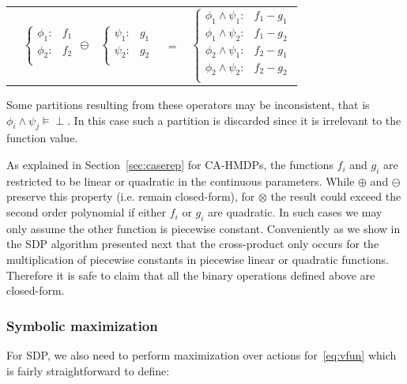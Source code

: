\documentclass[twoside,11pt]{article}
\begin{document}
{\begin{center}
\hspace{-2mm}
\begin{tabular}{r c c c l}
&
\hspace{-6mm} 
  $\begin{cases}
    \phi_1: & f_1 \\ 
    \phi_2: & f_2 \\ 
  \end{cases}$
$\ominus$
&
\hspace{-4mm}
  $\begin{cases}
    \psi_1: & g_1 \\ 
    \psi_2: & g_2 \\ 
  \end{cases}$
&
\hspace{-2mm} 
$ = $
&
\hspace{-2mm}
  $\begin{cases}
  \phi_1 \wedge \psi_1: & f_1 - g_1 \\ 
  \phi_1 \wedge \psi_2: & f_1 - g_2 \\ 
  \phi_2 \wedge \psi_1: & f_2 - g_1 \\ 
  \phi_2 \wedge \psi_2: & f_2 - g_2 \\ 
  \end{cases}$
\end{tabular}
\vspace{4mm}
\hspace{-2mm}
\end{center}
}
Some partitions resulting from
these operators may be inconsistent, that is $\phi_i \wedge \psi_j \models \perp$. In this case such a partition is discarded since it is irrelevant to the function value.

As explained in Section~\ref{sec:caserep} for CA-HMDPs, the functions $f_i$ and $g_i$ are restricted to be linear or quadratic in the continuous parameters. While $\oplus$ and $\ominus$ preserve this property (i.e. remain closed-form), for $\otimes$ the result could exceed the second order polynomial if either $f_i$ or $g_i$ are quadratic. In such cases we may only assume the other function is piecewise constant. Conveniently as we show in the SDP algorithm presented next that the cross-product only occurs for the multiplication of piecewise constants in piecewise linear or quadratic functions. Therefore it is safe to claim that all the binary operations defined above are closed-form.


\subsubsection*{Symbolic maximization}
For SDP, we also need to perform maximization over actions for~\eqref{eq:vfun} which is fairly straightforward
to define:
\end{document}
